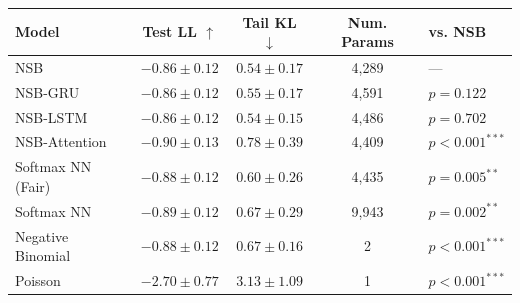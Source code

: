 \begin{tabular}{lcccl}
\toprule
\textbf{Model} & \textbf{Test LL} $\uparrow$ & \textbf{Tail KL} $\downarrow$ & \textbf{Num. Params} & \textbf{vs. NSB} \\
\midrule
NSB & $-0.86 \pm 0.12$ & $0.54 \pm 0.17$ & 4,289 & — \\
NSB-GRU & $-0.86 \pm 0.12$ & $0.55 \pm 0.17$ & 4,591 & $p=0.122$ \\
NSB-LSTM & \textbf{$-0.86 \pm 0.12$} & \textbf{$0.54 \pm 0.15$} & 4,486 & $p=0.702$ \\
NSB-Attention & $-0.90 \pm 0.13$ & $0.78 \pm 0.39$ & 4,409 & $p<0.001^{***}$ \\
Softmax NN (Fair) & $-0.88 \pm 0.12$ & $0.60 \pm 0.26$ & 4,435 & $p=0.005^{**}$ \\
Softmax NN & $-0.89 \pm 0.12$ & $0.67 \pm 0.29$ & 9,943 & $p=0.002^{**}$ \\
Negative Binomial & $-0.88 \pm 0.12$ & $0.67 \pm 0.16$ & 2 & $p<0.001^{***}$ \\
Poisson & $-2.70 \pm 0.77$ & $3.13 \pm 1.09$ & 1 & $p<0.001^{***}$ \\
\bottomrule
\end{tabular}